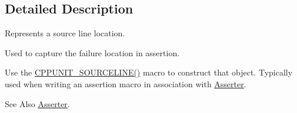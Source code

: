 \subsection{Detailed Description}
Represents a source line location.

Used to capture the failure location in assertion. 

Use the \hyperlink{_source_line_8h_a76898763afdc78bf5924dd7744b4c630}{C\-P\-P\-U\-N\-I\-T\-\_\-\-S\-O\-U\-R\-C\-E\-L\-I\-N\-E()} macro to construct that object. Typically used when writing an assertion macro in association with \hyperlink{struct_asserter}{Asserter}.

\begin{DoxySeeAlso}{See Also}
\hyperlink{struct_asserter}{Asserter}. 
\end{DoxySeeAlso}


